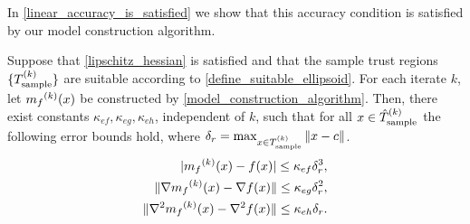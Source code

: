 \documentclass{article}
\begin{document}
In \cref{linear_accuracy_is_satisfied} we show that this accuracy condition is satisfied by our model construction algorithm.

%
%
%
%


\begin{theorem}
\label{linear_accuracy_is_satisfied}

Suppose that  \cref{lipschitz_hessian} is satisfied and that 
 the sample trust regions $\{{T_{\text{sample}}^{(k)}}\}$ are suitable 
 according to \cref{define_suitable_ellipsoid}.    For each iterate $k$, let ${{m}_f}^{(k)}(x)$ be constructed by \cref{model_construction_algorithm}.    
Then,  there exist constants $\kappa_{ef}, \kappa_{eg}, \kappa_{eh}$, independent of $k$,  such that for all $x \in {\hat{T}_{\text{sample}}^{(k)}}$ the following error bounds hold, where $\delta_r = \max_{x \in {T_{\text{sample}}^{(k)}}} \|x - c\|$.
 \begin{align*}
|{{m}_f}^{(k)}(x) - f(x)| \le \kappa_{ef} \delta_r^3, \\
\|\nabla {{m}_f}^{(k)}(x) - \nabla  f(x)\| \le \kappa_{eg}\delta_r^2,  \\
\|\nabla^2 {{m}_f}^{(k)}(x) - \nabla^2  f(x)\| \le \kappa_{eh}\delta_r. 
\end{align*}


\end{theorem}
\end{document}
